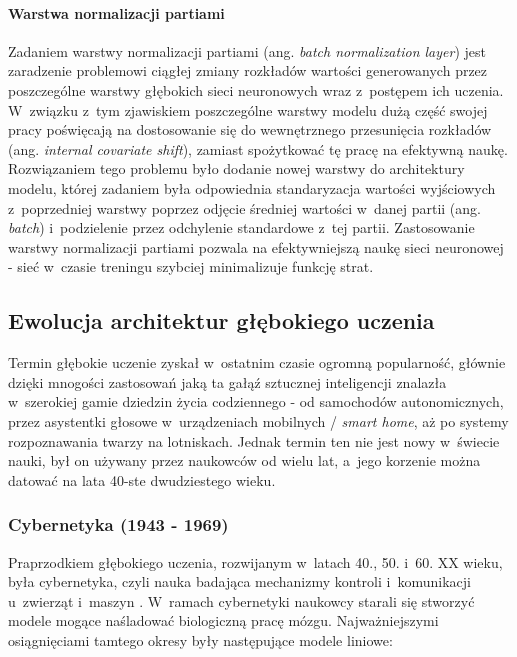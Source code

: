 \paragraph*{Warstwa normalizacji partiami}

Zadaniem warstwy normalizacji partiami (ang. \emph{batch normalization layer}) jest zaradzenie problemowi ciągłej zmiany rozkładów wartości generowanych przez poszczególne warstwy głębokich sieci neuronowych wraz z~postępem ich uczenia. W~związku z~tym zjawiskiem poszczególne warstwy modelu dużą część swojej pracy poświęcają na dostosowanie się do wewnętrznego przesunięcia rozkładów (ang. \emph{internal covariate shift}), zamiast spożytkować tę pracę na efektywną naukę. Rozwiązaniem tego problemu było dodanie nowej warstwy do architektury modelu, której zadaniem była odpowiednia standaryzacja wartości wyjściowych z~poprzedniej warstwy poprzez odjęcie średniej wartości w~danej partii (ang. \emph{batch}) i~podzielenie przez odchylenie standardowe z~tej partii. Zastosowanie warstwy normalizacji partiami pozwala na efektywniejszą naukę sieci neuronowej - sieć w~czasie treningu szybciej minimalizuje funkcję strat.

\subsection{Ewolucja architektur głębokiego uczenia}

Termin głębokie uczenie zyskał w~ostatnim czasie ogromną popularność, głównie dzięki mnogości zastosowań jaką ta gałąź sztucznej inteligencji znalazła w~szerokiej gamie dziedzin życia codziennego - od samochodów autonomicznych, przez asystentki głosowe w~urządzeniach mobilnych / \emph{smart home}, aż po systemy rozpoznawania twarzy na lotniskach. Jednak termin ten nie jest nowy w~świecie nauki, był on używany przez naukowców od wielu lat, a~jego korzenie można datować na lata 40-ste dwudziestego wieku. 

\subsubsection{Cybernetyka (1943 - 1969)}
Praprzodkiem głębokiego uczenia, rozwijanym w~latach 40., 50. i~60. XX wieku, była cybernetyka, czyli nauka badająca mechanizmy kontroli i~komunikacji u~zwierząt i~maszyn \cite{wiener}. W~ramach cybernetyki naukowcy starali się stworzyć modele mogące naśladować biologiczną pracę mózgu. Najważniejszymi osiągnięciami tamtego okresy były następujące modele liniowe:

